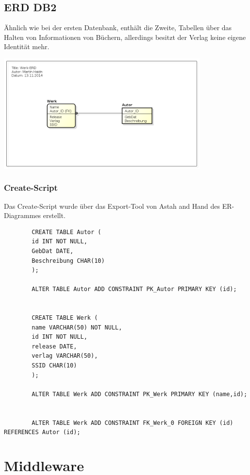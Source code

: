 \documentclass[a4paper]{article}
\begin{document}
	\newpage
	\subsection{ERD DB2}
	Ähnlich wie bei der ersten Datenbank, enthält die Zweite, Tabellen über das Halten von Informationen von Büchern, allerdings besitzt der Verlag keine eigene Identität mehr.
	\begin{center}
		\includegraphics[width=0.8\textwidth]{img/werk-erd.png}
	\end{center}
	
	\subsubsection{Create-Script}
	Das Create-Script wurde über das Export-Tool von Astah and Hand des ER-Diagrammes erstellt.
	\begin{tiny}
		\begin{lstlisting}
		CREATE TABLE Autor (
		id INT NOT NULL,
		GebDat DATE,
		Beschreibung CHAR(10)
		);
		
		ALTER TABLE Autor ADD CONSTRAINT PK_Autor PRIMARY KEY (id);
		
		
		CREATE TABLE Werk (
		name VARCHAR(50) NOT NULL,
		id INT NOT NULL,
		release DATE,
		verlag VARCHAR(50),
		SSID CHAR(10)
		);
		
		ALTER TABLE Werk ADD CONSTRAINT PK_Werk PRIMARY KEY (name,id);
		
		
		ALTER TABLE Werk ADD CONSTRAINT FK_Werk_0 FOREIGN KEY (id) REFERENCES Autor (id);
		\end{lstlisting}
	\end{tiny}
	
	\newpage
	\section{Middleware}
\end{document}
